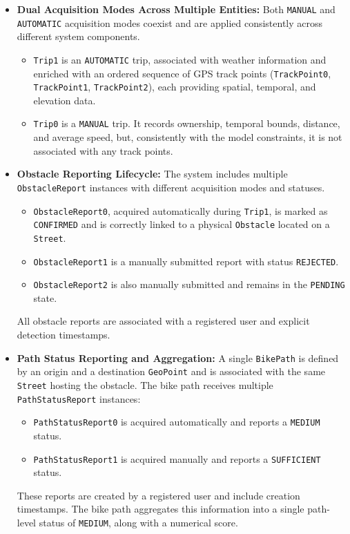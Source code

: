\begin{itemize}
    \item \textbf{Dual Acquisition Modes Across Multiple Entities:}  
    Both \texttt{MANUAL} and \texttt{AUTOMATIC} acquisition modes coexist and are applied consistently across different system components.
    \begin{itemize}
        \item \texttt{Trip1} is an \texttt{AUTOMATIC} trip, associated with weather information and enriched with an ordered sequence of GPS track points (\texttt{TrackPoint0}, \texttt{TrackPoint1}, \texttt{TrackPoint2}), each providing spatial, temporal, and elevation data.
        \item \texttt{Trip0} is a \texttt{MANUAL} trip. It records ownership, temporal bounds, distance, and average speed, but, consistently with the model constraints, it is not associated with any track points.
    \end{itemize}

    \item \textbf{Obstacle Reporting Lifecycle:}  
    The system includes multiple \texttt{ObstacleReport} instances with different acquisition modes and statuses.
    \begin{itemize}
        \item \texttt{ObstacleReport0}, acquired automatically during \texttt{Trip1}, is marked as \texttt{CONFIRMED} and is correctly linked to a physical \texttt{Obstacle} located on a \texttt{Street}.
        \item \texttt{ObstacleReport1} is a manually submitted report with status \texttt{REJECTED}.
        \item \texttt{ObstacleReport2} is also manually submitted and remains in the \texttt{PENDING} state.
    \end{itemize}
    All obstacle reports are associated with a registered user and explicit detection timestamps.

    \item \textbf{Path Status Reporting and Aggregation:}  
    A single \texttt{BikePath} is defined by an origin and a destination \texttt{GeoPoint} and is associated with the same \texttt{Street} hosting the obstacle.
    The bike path receives multiple \texttt{PathStatusReport} instances:
    \begin{itemize}
        \item \texttt{PathStatusReport0} is acquired automatically and reports a \texttt{MEDIUM} status.
        \item \texttt{PathStatusReport1} is acquired manually and reports a \texttt{SUFFICIENT} status.
    \end{itemize}
    These reports are created by a registered user and include creation timestamps. The bike path aggregates this information into a single path-level status of \texttt{MEDIUM}, along with a numerical score.


\end{itemize}
